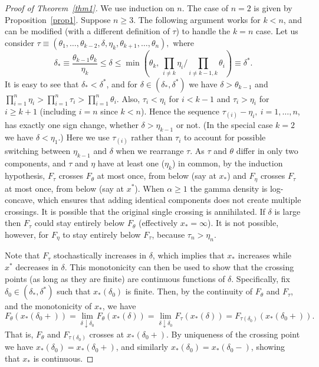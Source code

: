 \documentclass[11pt]{article}
\begin{document}
\begin{proof}[Proof of Theorem~\ref{thm1}]
We use induction on $n$.  The case of $n=2$ is given by Proposition~\ref{prop1}.  Suppose $n\geq 3$.  The following argument works for $k<n$, and can be modified (with a different definition of $\tau$) to handle the $k=n$ case.  Let us consider $\tau \equiv (\theta_1, \ldots, \theta_{k-2}, \delta, \eta_{k}, \theta_{k+1}, \ldots, \theta_n),$ where  
$$\delta_*\equiv \frac{\theta_{k-1}\theta_{k}}{\eta_{k}}\leq \delta\leq \min\left(\theta_{k},\, \prod_{i\neq k} \eta_i/\prod_{i\neq k-1, k} \theta_i\right)\equiv \delta^*.$$
It is easy to see that $\delta_*<\delta^*$, and for $\delta\in (\delta_*, \delta^*)$ we have $\delta > \theta_{k-1}$ and $\prod_{i=1}^n \eta_i > \prod_{i=1}^n \tau_i > \prod_{i=1}^n \theta_i$. 
Also, $\tau_i <\eta_i$ for $i< k-1$ and $\tau_i >\eta_i$ for $i\geq k+1$ (including $i=n$ since $k<n$).  Hence the sequence $\tau_{(i)} - \eta_i,\ i=1,\ldots, n$, has exactly one sign change, whether $\delta > \eta_{k-1}$ or not.  (In the special case $k=2$ we have $\delta < \eta_1$.)  Here we use $\tau_{(i)}$ rather than $\tau_i$ to account for possible switching between $\eta_{k-1}$ and $\delta$ when we rearrange $\tau$.  As $\tau$ and $\theta$ differ in only two components, and $\tau$ and $\eta$ have at least one ($\eta_k$) in common, by the induction hypothesis, $F_\tau$ crosses $F_\theta$ at most once, from below (say at $x_*$) and $F_\eta$ crosses $F_\tau$ at most once, from below (say at $x^*$).  When $\alpha \geq 1$ the gamma density is log-concave, which ensures that adding identical components does not create multiple crossings.  It is possible that the original single crossing is annihilated.  If $\delta$ is large then $F_\tau$ could stay entirely below $F_\theta$ (effectively $x_*=\infty$).  It is not possible, however, for $F_\eta$ to stay entirely below $F_\tau$, because $\tau_n>\eta_n$. 

Note that $F_\tau$ stochastically increases in $\delta$, which implies that $x_*$ increases while $x^*$ decreases in $\delta$.  This monotonicity can then be used to show that the crossing points (as long as they are finite) are continuous functions of $\delta$.  Specifically, fix $\delta_0\in (\delta_*, \delta^*)$ such that $x_*(\delta_0)$ is finite.  Then, by the continuity of $F_\theta$ and $F_\tau$, and the monotonicity of $x_*$, we have 
$$F_\theta(x_*(\delta_0 +)) = \lim_{\delta \downarrow \delta_0}  F_\theta(x_*(\delta)) = \lim_{\delta \downarrow \delta_0} F_\tau (x_*(\delta)) = F_{\tau(\delta_0)}(x_*(\delta_0 + )).
$$
That is, $F_\theta$ and $F_{\tau(\delta_0)}$ crosses at $x_*(\delta_0 +)$.  By uniqueness of the crossing point we have $x_*(\delta_0) = x_*(\delta_0 +)$, and similarly $x_*(\delta_0) = x_*(\delta_0 -)$, showing that $x_*$ is continuous.  
 

\end{proof}
\end{document}
